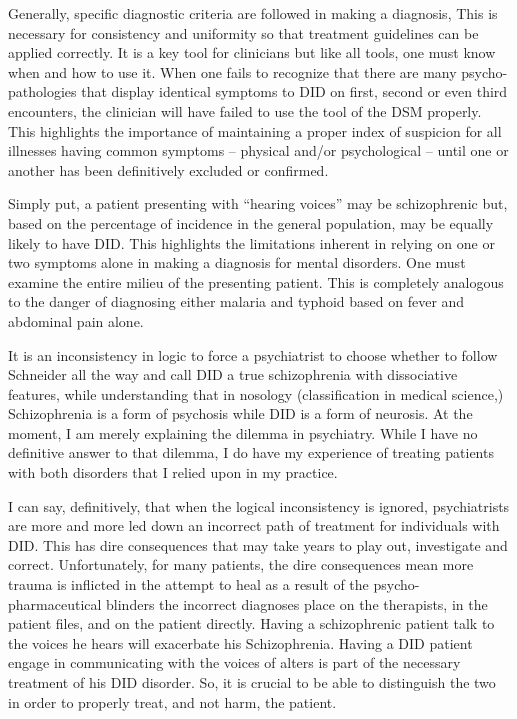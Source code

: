 \documentclass[]{book}
\begin{document}
Generally, specific diagnostic criteria are followed in making a diagnosis, This is necessary for consistency and uniformity so that treatment guidelines can be applied correctly. It is a key tool for clinicians but like all tools, one must know when and how to use it. When one fails to recognize that there are many psycho-pathologies that display identical symptoms to DID on first, second or even third encounters, the clinician will have failed to use the tool of the DSM properly. This highlights the importance of maintaining a proper index of suspicion for all illnesses having common symptoms -- physical and/or psychological -- until one or another has been definitively excluded or confirmed.

Simply put, a patient presenting with ``hearing voices'' may be schizophrenic but, based on the percentage of incidence in the general population, may be equally likely to have DID. This highlights the limitations inherent in relying on one or two symptoms alone in making a diagnosis for mental disorders. One must examine the entire milieu of the presenting patient. This is completely analogous to the danger of diagnosing either malaria and typhoid based on fever and abdominal pain alone.

It is an inconsistency in logic to force a psychiatrist to choose whether to follow Schneider all the way and call DID a true schizophrenia with dissociative features, while understanding that in nosology (classification in medical science,) Schizophrenia is a form of psychosis while DID is a form of neurosis. At the moment, I am merely explaining the dilemma in psychiatry. While I have no definitive answer to that dilemma, I do have my experience of treating patients with both disorders that I relied upon in my practice.

I can say, definitively, that when the logical inconsistency is ignored, psychiatrists are more and more led down an incorrect path of treatment for individuals with DID. This has dire consequences that may take years to play out, investigate and correct. Unfortunately, for many patients, the dire consequences mean more trauma is inflicted in the attempt to heal as a result of the psycho-pharmaceutical blinders the incorrect diagnoses place on the therapists, in the patient files, and on the patient directly. Having a schizophrenic patient talk to the voices he hears will exacerbate his Schizophrenia. Having a DID patient engage in communicating with the voices of alters is part of the necessary treatment of his DID disorder. So, it is crucial to be able to distinguish the two in order to properly treat, and not harm, the patient.
\end{document}
